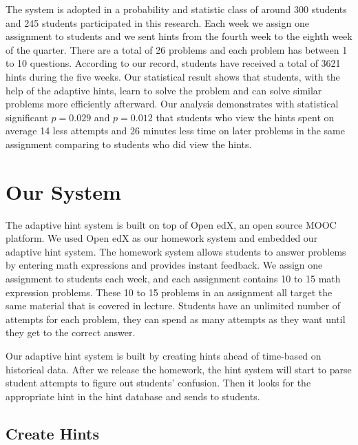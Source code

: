 \documentclass{llncs}
\begin{document}
The system is adopted in a probability and statistic class of around 300 students and 245 students participated in this research. Each week we assign one assignment to students and we sent hints from the fourth week to the eighth week of the quarter. There are a total of 26 problems and each problem has between 1 to 10 questions. According to our record, students have received a total of 3621 hints during the five weeks. Our statistical result shows that students, with the help of the adaptive hints, learn to solve the problem and can solve similar problems more efficiently afterward. Our analysis demonstrates with statistical significant $p=0.029$ and $p=0.012$ that students who view the hints spent on average 14 less attempts and 26 minutes less time on later problems in the same assignment comparing to students who did view the hints.



\section{Our System}
The adaptive hint system is built on top of Open edX, an open source MOOC platform. We used Open edX as our homework system and embedded our adaptive hint system. The homework system allows students to answer problems by entering math expressions and provides instant feedback. We assign one assignment to students each week, and each assignment contains 10 to 15 math expression problems. These 10 to 15 problems in an assignment all target the same material that is covered in lecture. Students have an unlimited number of attempts for each problem, they can spend as many attempts as they want until they get to the correct answer.

Our adaptive hint system is built by creating hints ahead of time-based on historical data. After we release the homework, the hint system will start to parse student attempts to figure out students' confusion. Then it looks for the appropriate hint in the hint database and sends to students.

\subsection*{Create Hints}
\end{document}

